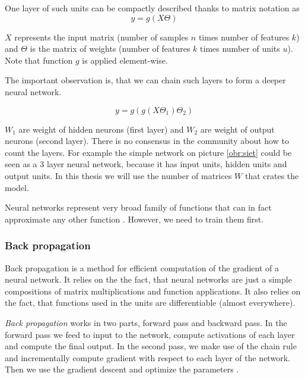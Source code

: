     One layer of such units can be compactly described thanks to matrix notation as
    $$y=g(X \Theta)$$
    
    $X$ represents the input matrix (number of samples $n$ times number of features $k$) and $\Theta$ is the matrix of weights (number of features $k$ times number of units $u$). Note that function $g$ is applied element-wise.
    
    The important observation is, that we can chain such layers to form a deeper neural network.
    
    $$y=g(g(X \Theta_1) \Theta_2)$$
    
    $W_1$ are weight of hidden neurons (first layer) and $W_2$ are weight of output neurons (second layer).
    There is no consensus in the community about how to count the layers. 
    For example the simple network on picture \ref{obr:siet} could be seen as a $3$ layer neural network,
    because it has input units, hidden units and output units.
    In this thesis we will use the number of matrices $W$ that crates the model.
    
    Neural networks represent very broad family of functions that can in fact approximate any other function \cite{cybenko1989approximation}.
    However, we need to train them first.
    
    \subsubsection{Back propagation} \label{sec:backprop}
    
    Back propagation is a method for efficient computation of the gradient of a neural network.
    It relies on the the fact, that neural networks are just a simple compositions of matrix multiplications and function applications. 
    It also relies on the fact, that functions used in the units are differentiable (almost everywhere).
    
    \textit{Back propagation} works in two parts, forward pass and backward pass.
    In the forward pass we feed to input to the network, compute activations of each layer and compute the final output.
    In the second pass, we make use of the chain rule and incrementally compute gradient with respect to each layer of the network.
    Then we use the gradient descent and optimize the parameters \cite{rumelhart1986david}.
    
    \* %
    
